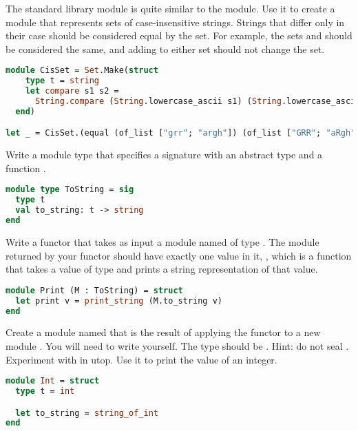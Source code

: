 \problem[sets]
The standard library  module is quite similar to the  module. Use it to create a module that represents sets of case-insensitive strings. Strings that differ only in their case should be considered equal by the set. For example, the sets  and  should be considered the same, and adding  to either set should not change the set.

\begin{lstlisting}[language=OCaml]
module CisSet = Set.Make(struct
    type t = string
    let compare s1 s2 =
      String.compare (String.lowercase_ascii s1) (String.lowercase_ascii s2)
  end)

let _ = CisSet.(equal (of_list ["grr"; "argh"]) (of_list ["GRR"; "aRgh"]))
\end{lstlisting}

\problem[ToString]
Write a module type  that specifies a signature with an abstract type  and a function .

\begin{lstlisting}[language=OCaml]
module type ToString = sig
  type t
  val to_string: t -> string
end
\end{lstlisting}

\problem[Print]
Write a functor  that takes as input a module named  of type . The module returned by your functor should have exactly one value in it, , which is a function that takes a value of type  and prints a string representation of that value.

\begin{lstlisting}[language=OCaml]
module Print (M : ToString) = struct
  let print v = print_string (M.to_string v)
end
\end{lstlisting}

Create a module named  that is the result of applying the functor  to a new module . You will need to write  yourself. The type  should be . Hint: do not seal .
Experiment with  in utop. Use it to print the value of an integer.

\begin{lstlisting}[language=OCaml]
module Int = struct
  type t = int

  let to_string = string_of_int
end
\end{lstlisting}

